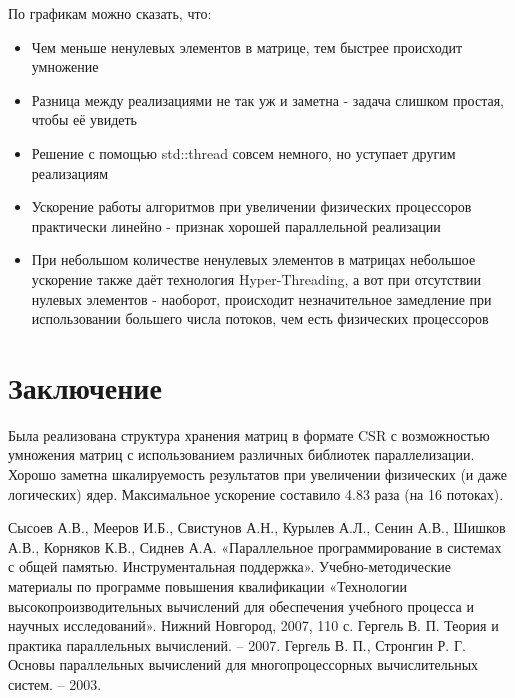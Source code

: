 \documentclass{report}
\begin{document}
\par По графикам можно сказать, что:
\begin{itemize}
    \item Чем меньше ненулевых элементов в матрице, тем быстрее происходит умножение
    \item Разница между реализациями не так уж и заметна - задача слишком простая, чтобы её увидеть
    \item Решение с помощью std::thread совсем немного, но уступает другим реализациям
    \item Ускорение работы алгоритмов при увеличении физических процессоров практически линейно - признак хорошей параллельной реализации
    \item При небольшом количестве ненулевых элементов в матрицах небольшое ускорение также даёт технология Hyper-Threading, а вот при отсутствии нулевых элементов - наоборот, происходит незначительное замедление при использовании большего числа потоков, чем есть физических процессоров
\end{itemize}
\newpage

\section*{Заключение}
Была реализована структура хранения матриц в формате CSR с возможностью умножения матриц с использованием различных библиотек параллелизации. Хорошо заметна шкалируемость результатов при увеличении физических (и даже логических) ядер. Максимальное ускорение составило 4.83 раза (на 16 потоках).


\newpage
\begin{thebibliography}{1}
Сысоев А.В., Мееров И.Б., Свистунов А.Н., Курылев А.Л., Сенин А.В., Шишков А.В., Корняков К.В., Сиднев А.А. «Параллельное программирование в системах с общей памятью. Инструментальная поддержка». Учебно-методические материалы по программе повышения квалификации «Технологии высокопроизводительных вычислений для обеспечения учебного процесса и научных исследований». Нижний Новгород, 2007, 110 с. 
Гергель В. П. Теория и практика параллельных вычислений. – 2007. 
Гергель В. П., Стронгин Р. Г. Основы параллельных вычислений для многопроцессорных вычислительных систем. – 2003.
\end{thebibliography}

\newpage
\end{document}
